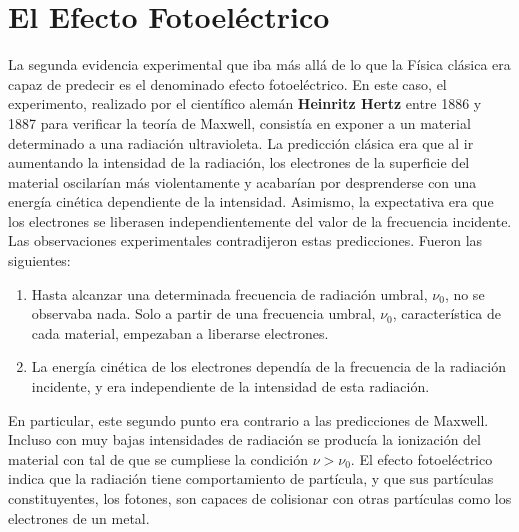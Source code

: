 \documentclass{tufte-handout}
\begin{document}
\section{El Efecto Fotoeléctrico}
La segunda evidencia experimental que iba más allá de lo que la 
Física clásica era capaz de predecir es el denominado efecto
fotoeléctrico. 
En este caso, el experimento, realizado por el científico
alemán \textbf{Heinritz Hertz} entre 1886 y 1887 para
verificar la teoría de Maxwell, consistía en 
exponer a un material determinado a una radiación ultravioleta.
La predicción clásica era que al ir aumentando la intensidad
de la radiación, los electrones de la superficie del material
oscilarían más violentamente y acabarían por desprenderse
con una energía cinética dependiente de la intensidad.
Asimismo, la expectativa era que los electrones se liberasen
independientemente del valor de la frecuencia incidente.
Las observaciones experimentales contradijeron estas predicciones.
Fueron las siguientes:
\begin{enumerate}
    \item Hasta alcanzar una determinada frecuencia de radiación
    umbral, $\nu_0$, no se observaba nada. Solo a
    partir de una frecuencia umbral, $\nu_0$, característica
    de cada material, empezaban a liberarse electrones.
    \item La energía cinética de los electrones dependía de la frecuencia de la radiación incidente, y era independiente de
    la intensidad de esta radiación.
\end{enumerate}
En particular, este segundo punto era contrario a las predicciones de
Maxwell. Incluso con muy bajas intensidades de radiación
se producía la ionización del material con tal de que se cumpliese
la condici\'on $\nu>\nu_0$.
El efecto fotoeléctrico indica que la radiación
tiene comportamiento de partícula, y que sus partículas 
constituyentes, los fotones, son capaces de colisionar
con otras partículas como los electrones de un metal. 
\end{document}
